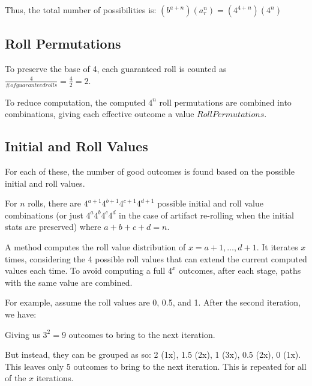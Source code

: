 \documentclass[12pt]{article}
\begin{document}
Thus, the total number of possibilities is: $(b^{a+n})(a_r^n) = (4^{4+n})(4^n)$

\subsection{Roll Permutations}

To preserve the base of 4, each guaranteed roll is counted as $\frac{4}{\# of guaranteed rolls} = \frac{4}{2} = 2$.

To reduce computation, the computed $4^n$ roll permutations are combined into combinations, giving each effective outcome a value $RollPermutations$.

\subsection{Initial and Roll Values}

For each of these, the number of good outcomes is found based on the possible initial and roll values.

For $n$ rolls, there are $4^{a+1}4^{b+1}4^{c+1}4^{d+1}$ possible initial and roll value combinations (or just $4^{a}4^{b}4^{c}4^{d}$ in the case of artifact re-rolling when the initial stats are preserved) where $a + b + c + d = n$.

A method computes the roll value distribution of $x = a+1, \dots, d+1$. It iterates $x$ times, considering the 4 possible roll values that can extend the current computed values each time. To avoid computing a full $4^x$ outcomes, after each stage, paths with the same value are combined.

For example, assume the roll values are 0, 0.5, and 1. After the second iteration, we have:


Giving us $3^2 = 9$ outcomes to bring to the next iteration.

But instead, they can be grouped as so: 2 (1x), 1.5 (2x), 1 (3x), 0.5 (2x), 0 (1x). This leaves only 5 outcomes to bring to the next iteration. This is repeated for all of the $x$ iterations.
\end{document}

